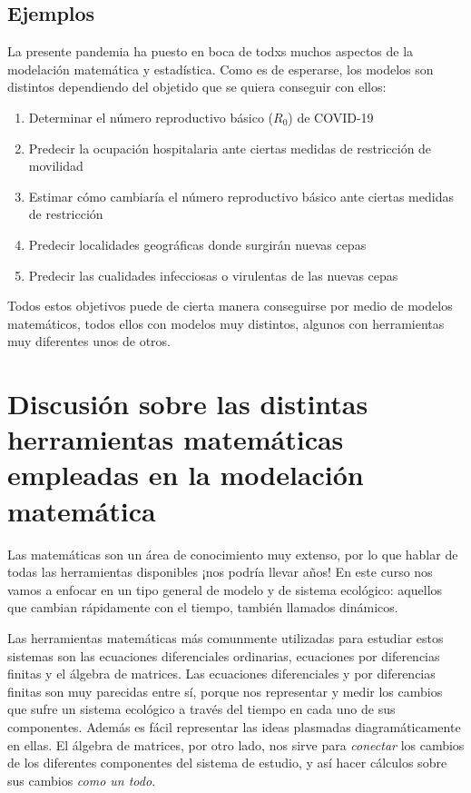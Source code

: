 \documentclass[
]{book}
\providecommand{\tightlist}{%
  \setlength{\itemsep}{0pt}\setlength{\parskip}{0pt}}
\begin{document}
\hypertarget{ejemplos}{%
\subsection{Ejemplos}\label{ejemplos}}

La presente pandemia ha puesto en boca de todxs muchos aspectos de la modelación matemática y estadística. Como es de esperarse, los modelos son distintos dependiendo del objetido que se quiera conseguir con ellos:

\begin{enumerate}
\def\labelenumi{\arabic{enumi}.}
\tightlist
\item
  Determinar el número reproductivo básico (\(R_0\)) de COVID-19
\item
  Predecir la ocupación hospitalaria ante ciertas medidas de restricción de movilidad
\item
  Estimar cómo cambiaría el número reproductivo básico ante ciertas medidas de restricción
\item
  Predecir localidades geográficas donde surgirán nuevas cepas
\item
  Predecir las cualidades infecciosas o virulentas de las nuevas cepas
\end{enumerate}

Todos estos objetivos puede de cierta manera conseguirse por medio de modelos matemáticos, todos ellos con modelos muy distintos, algunos con herramientas muy diferentes unos de otros.

\hypertarget{discusiuxf3n-sobre-las-distintas-herramientas-matemuxe1ticas-empleadas-en-la-modelaciuxf3n-matemuxe1tica}{%
\section{Discusión sobre las distintas herramientas matemáticas empleadas en la modelación matemática}\label{discusiuxf3n-sobre-las-distintas-herramientas-matemuxe1ticas-empleadas-en-la-modelaciuxf3n-matemuxe1tica}}

Las matemáticas son un área de conocimiento muy extenso, por lo que hablar de todas las herramientas disponibles ¡nos podría llevar años! En este curso nos vamos a enfocar en un tipo general de modelo y de sistema ecológico: aquellos que cambian rápidamente con el tiempo, también llamados dinámicos.

Las herramientas matemáticas más comunmente utilizadas para estudiar estos sistemas son las ecuaciones diferenciales ordinarias, ecuaciones por diferencias finitas y el álgebra de matrices. Las ecuaciones diferenciales y por diferencias finitas son muy parecidas entre sí, porque nos representar y medir los cambios que sufre un sistema ecológico a través del tiempo en cada uno de sus componentes. Además es fácil representar las ideas plasmadas diagramáticamente en ellas. El álgebra de matrices, por otro lado, nos sirve para \emph{conectar} los cambios de los diferentes componentes del sistema de estudio, y así hacer cálculos sobre sus cambios \emph{como un todo}.
\end{document}
